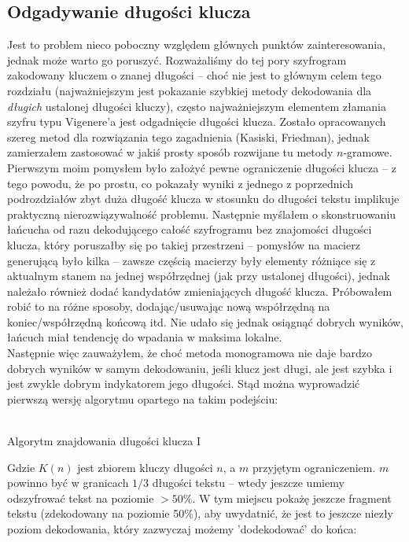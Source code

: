 \documentclass[a4paper]{article}
\DeclareMathOperator*{\argmax}{arg\,max}
\begin{document}
\subsection{Odgadywanie długości klucza}
Jest to problem nieco poboczny względem głównych punktów zainteresowania, jednak może warto go poruszyć. Rozważaliśmy do tej pory szyfrogram zakodowany kluczem o znanej długości – choć nie jest to głównym celem tego rozdziału (najważniejszym jest pokazanie szybkiej metody dekodowania dla \textit{długich} ustalonej długości kluczy), często najważniejszym elementem złamania szyfru typu Vigenere'a jest odgadnięcie długości klucza. Zostało opracowanych szereg metod dla rozwiązania tego zagadnienia (Kasiski, Friedman), jednak zamierzałem zastosować w jakiś prosty sposób rozwijane tu metody $n$-gramowe. Pierwszym moim pomysłem było założyć pewne ograniczenie długości klucza – z tego powodu, że po prostu, co pokazały wyniki z jednego z poprzednich podrozdziałów zbyt duża długość klucza w stosunku do długości tekstu implikuje praktyczną nierozwiązywalność problemu. Następnie myślałem o skonstruowaniu łańcucha od razu dekodującego całość szyfrogramu bez znajomości długości klucza, który poruszałby się po takiej przestrzeni – pomysłów na macierz generującą było kilka – zawsze częścią macierzy były elementy różniące się z aktualnym stanem na jednej współrzędnej (jak przy ustalonej długości), jednak należało również dodać kandydatów zmieniających długość klucza. Próbowałem robić to na różne sposoby, dodając/usuwając nową współrzędną na koniec/współrzędną końcową itd. Nie udało się jednak osiągnąć dobrych wyników, łańcuch miał tendencję do wpadania w maksima lokalne.\\
Następnie więc zauważyłem, że choć metoda monogramowa nie daje bardzo dobrych wyników w samym dekodowaniu, jeśli klucz jest długi, ale jest szybka i jest zwykle dobrym indykatorem jego długości. Stąd można wyprowadzić pierwszą wersję algorytmu opartego na takim podejściu:\\\\
\begin{algorithm}[H]
\caption{Algorytm znajdowania długości klucza I}
\Return{$\argmax_n max[n]$}
\end{algorithm}
Gdzie $K(n)$ jest zbiorem kluczy długości $n$, a $m$ przyjętym ograniczeniem. $m$ powinno być w granicach $1/3$ długości tekstu – wtedy jeszcze umiemy odszyfrować tekst na poziomie $>50\%$. W tym miejscu pokażę jeszcze fragment tekstu (zdekodowany na poziomie 50\%), aby uwydatnić, że jest to jeszcze niezły poziom dekodowania, który zazwyczaj możemy 'dodekodować' do końca:\\
\end{document}
